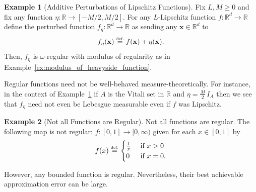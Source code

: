 \documentclass{article}
\numberwithin{equation}{section}
\theoremstyle{definition}
\newtheorem{example}{Example}[section]
\newcommand{\eqdef}{\ensuremath{\stackrel{\mbox{\upshape\tiny def.}}{=}}}
\begin{document}
\begin{example}[Additive Perturbations of Lipschitz Functions]
\label{ex:constructions_regular_but_discontinuous}
Fix $L,M\ge 0$ and fix any function $\eta:\mathbb{R}\to [-M/2,M/2]$.  For any $L$-Lipschitz function $f:\mathbb{R}^d\to \mathbb{R}$ define the perturbed function $f_{\eta}:\mathbb{R}^d\to\mathbb{R}$ as sending any $\mathbf{x}\in \mathbb{R}^d$ to
\[
    f_{\eta}(\mathbf{x})\eqdef f(\mathbf{x}) + \eta(\mathbf{x})
.
\]
Then, $f_{\eta}$ is $\omega$-regular with modulus of regularity as in Example~\ref{ex:modulus_of_heavyside_function}. 
\end{example}
Regular functions need not be well-behaved measure-theoretically.  For instance, in the context of Example~\ref{ex:constructions_regular_but_discontinuous} if $A$ is the Vitali set in $\mathbb{R}$ and $\eta=\frac{M}{2}\,I_{A}$ then we see that $f_{\eta}$ need not even be Lebesgue measurable even if $f$ was Lipschitz.  

\begin{example}[Not all Functions are Regular]
Not all functions are regular.  The following map is not regular: $f:[0,1]\to [0,\infty)$ given for each $x\in [0,1]$ by
\[
    f(x)
    \eqdef
    \begin{cases}
        \frac{1}{x} & \mbox{ if } x>0\\
        0 & \mbox{ if } x=0
.
    \end{cases}
\]
\end{example}
However, any bounded function is regular.  Nevertheless, their best achievable approximation error can be large.
\end{document}
